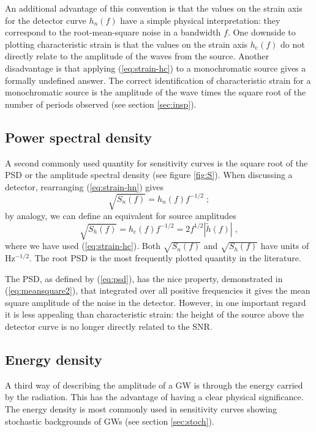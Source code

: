 An additional advantage of this convention is that the values on the strain axis for the detector curve $h_n(f)$ have a simple physical interpretation: they correspond to the root-mean-square noise in a bandwidth $f$. One downside to plotting characteristic strain is that the values on the strain axis $h_\mathrm{c}(f)$ do not directly relate to the amplitude of the waves from the source. 
Another disadvantage is that applying (\ref{eq:strain-hc}) to a monochromatic source gives a formally undefined answer. The correct identification of characteristic strain for a monochromatic source is the amplitude of the wave times the square root of the number of periods observed (see section \ref{sec:insp}).

\subsection{Power spectral density}\label{sec:psd}

A second commonly used quantity for sensitivity curves is the square root of the PSD or the amplitude spectral density (see figure \ref{fig:S}). When discussing a detector, rearranging (\ref{eq:strain-hn}) gives
\begin{equation}\label{eq:temp1}
\sqrt{S_{n}(f)} = h_{n}(f)f^{-1/2} \; ;
\end{equation}
by analogy, we can define an equivalent for source amplitudes
\begin{equation}
\sqrt{S_{h}(f)} = h_\mathrm{c}(f)f^{-1/2} = 2 f^{1/2} \left| \tilde{h}(f) \right| \; ,
\label{eq:ShforSources}
\end{equation}
where we have used (\ref{eq:strain-hc}). Both $\sqrt{S_{n}(f)}$ and $\sqrt{S_{h}(f)}$ have units of $\mathrm{Hz^{-1/2}}$. The root PSD is the most frequently plotted quantity in the literature.

The PSD, as defined by (\ref{eq:psd}), has the nice property, demonstrated in (\ref{eq:meansquare2}), that integrated over all positive frequencies it gives the mean square amplitude of the noise in the detector. However, in one important regard it is less appealing than characteristic strain: the height of the source above the detector curve is no longer directly related to the SNR.


\subsection{Energy density}\label{sec:energy-density}

A third way of describing the amplitude of a GW is through the energy carried by the radiation. This has the advantage of having a clear physical significance. The energy density is most commonly used in sensitivity curves showing stochastic backgrounds of GWs (see section \ref{sec:stoch}).


